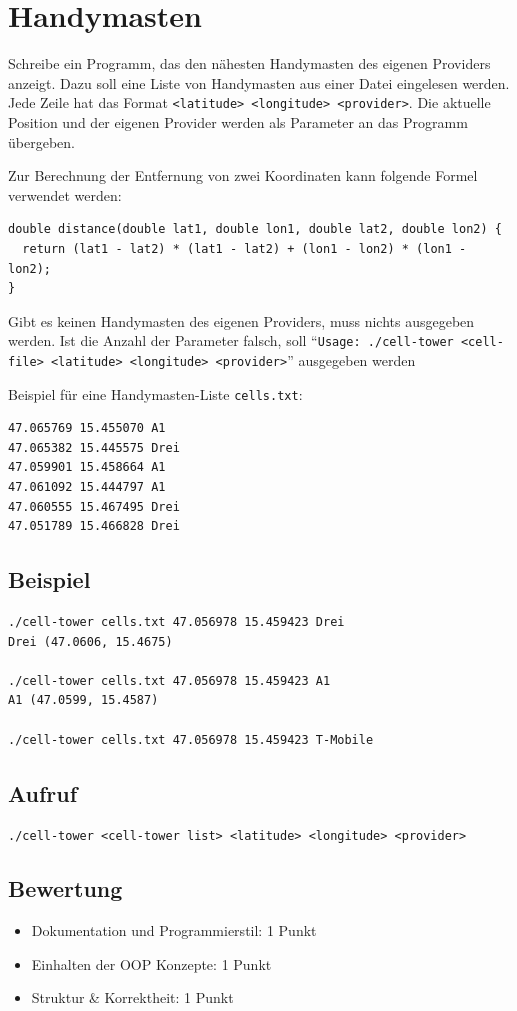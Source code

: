 \documentclass[a4paper,10pt]{article}
\begin{document}
\section*{Handymasten}

Schreibe ein Programm, das den nähesten Handymasten des eigenen Providers anzeigt. Dazu soll eine Liste von Handymasten aus einer Datei eingelesen werden. Jede Zeile hat das Format \texttt{<latitude> <longitude> <provider>}. Die aktuelle Position und der eigenen Provider werden als Parameter an das Programm übergeben. 

Zur Berechnung der Entfernung von zwei Koordinaten kann folgende Formel verwendet werden:
\begin{lstlisting}[basicstyle=\footnotesize]
double distance(double lat1, double lon1, double lat2, double lon2) {
  return (lat1 - lat2) * (lat1 - lat2) + (lon1 - lon2) * (lon1 - lon2);
}
\end{lstlisting}

Gibt es keinen Handymasten des eigenen Providers, muss nichts ausgegeben werden. Ist die Anzahl der Parameter falsch, soll ``\texttt{Usage: ./cell-tower <cell-file> <latitude> <longitude> <provider>}'' ausgegeben werden

\vspace{1em}

Beispiel für eine Handymasten-Liste \texttt{cells.txt}:
\begin{lstlisting}[frame=single]
47.065769 15.455070 A1
47.065382 15.445575 Drei
47.059901 15.458664 A1
47.061092 15.444797 A1
47.060555 15.467495 Drei
47.051789 15.466828 Drei
\end{lstlisting}

\subsection*{Beispiel}
\begin{verbatim}
./cell-tower cells.txt 47.056978 15.459423 Drei
Drei (47.0606, 15.4675)

./cell-tower cells.txt 47.056978 15.459423 A1
A1 (47.0599, 15.4587)

./cell-tower cells.txt 47.056978 15.459423 T-Mobile
\end{verbatim}

\subsection*{Aufruf}
\texttt{./cell-tower <cell-tower list> <latitude> <longitude> <provider>}

\subsection*{Bewertung}
\begin{itemize}
 \item Dokumentation und Programmierstil: 1 Punkt
 \item Einhalten der OOP Konzepte: 1 Punkt
 \item Struktur \& Korrektheit: 1 Punkt
\end{itemize}

\newpage
\end{document}
